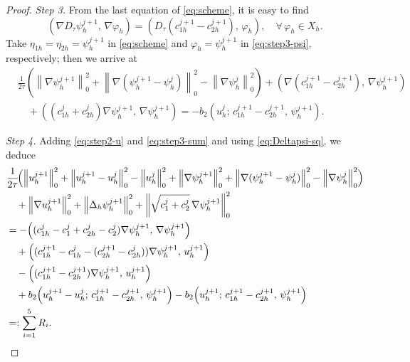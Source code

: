 \begin{proof}
\textit{Step 3.}
From the last equation of \eqref{eq:scheme}, it is easy to find
\begin{equation}
  \left(\nabla D_{\tau}\psi_{h}^{j+1},\, \nabla\varphi_{h}\right)
  = \left(D_{\tau}(c_{1h}^{j+1} - c_{2h}^{j+1}),\, \varphi_{h}\right),
  \quad \forall\,\varphi_{h} \in X_{h}.
  \label{eq:step3-psi}
\end{equation}
Take $\eta_{1h} = \eta_{2h} = \psi_{h}^{j+1}$ in \eqref{eq:scheme} and
$\varphi_{h} = \psi_{h}^{j+1}$ in \eqref{eq:step3-psi}, respectively; then we arrive at
\begin{align}
  &\frac{1}{2\tau}\!\left(
    \left\|\nabla\psi_{h}^{j+1}\right\|_{0}^{2}
    + \left\|\nabla(\psi_{h}^{j+1} - \psi_{h}^{j})\right\|_{0}^{2}
    - \left\|\nabla\psi_{h}^{j}\right\|_{0}^{2}
  \right)
  + \left(\nabla(c_{1h}^{j+1} - c_{2h}^{j+1}),\, \nabla\psi_{h}^{j+1}\right)
  \nonumber\\
  &\quad
  + \left((c_{1h}^{j} + c_{2h}^{j})\nabla\psi_{h}^{j+1},\, \nabla\psi_{h}^{j+1}\right)
  = -b_{2}\!\left(u_{h}^{j};\, c_{1h}^{j+1} - c_{2h}^{j+1},\, \psi_{h}^{j+1}\right).
  \label{eq:step3-sum}
\end{align}

\textit{Step 4.}
Adding \eqref{eq:step2-u} and \eqref{eq:step3-sum} and using \eqref{eq:Deltapsi-sq}, we deduce
\begin{align}
  &\frac{1}{2\tau}\!\Bigl(
    \left\|u_{h}^{j+1}\right\|_{0}^{2}
    + \left\|u_{h}^{j+1} - u_{h}^{j}\right\|_{0}^{2}
    - \left\|u_{h}^{j}\right\|_{0}^{2}
    + \left\|\nabla\psi_{h}^{j+1}\right\|_{0}^{2}
    + \left\|\nabla(\psi_{h}^{j+1} - \psi_{h}^{j})\right\|_{0}^{2}
    - \left\|\nabla\psi_{h}^{j}\right\|_{0}^{2}
  \Bigr)
  \nonumber\\
  &\quad
  + \left\|\nabla u_{h}^{j+1}\right\|_{0}^{2}
  + \left\|\Delta_{h}\psi_{h}^{j+1}\right\|_{0}^{2}
  + \left\|\sqrt{c_{1}^{j} + c_{2}^{j}}\,\nabla\psi_{h}^{j+1}\right\|_{0}^{2}
  \nonumber\\
  &= -\!\left((c_{1h}^{j} - c_{1}^{j} + c_{2h}^{j} - c_{2}^{j})\nabla\psi_{h}^{j+1},\,
              \nabla\psi_{h}^{j+1}\right)
  \nonumber\\
  &\quad
  + \left((c_{1h}^{j+1} - c_{1h}^{j} - (c_{2h}^{j+1} - c_{2h}^{j}))\nabla\psi_{h}^{j+1},\,
         u_{h}^{j+1}\right)
  \nonumber\\
  &\quad
  - \left((c_{1h}^{j+1} - c_{2h}^{j+1})\nabla\psi_{h}^{j+1},\, u_{h}^{j+1}\right)
  \nonumber\\
  &\quad
  + b_{2}\!\left(u_{h}^{j+1} - u_{h}^{j};\, c_{1h}^{j+1} - c_{2h}^{j+1},\, \psi_{h}^{j+1}\right)
  - b_{2}\!\left(u_{h}^{j+1};\, c_{1h}^{j+1} - c_{2h}^{j+1},\, \psi_{h}^{j+1}\right)
  \nonumber\\
  &=: \sum_{i=1}^{5} R_{i}.
  \label{eq:step4-Ri}
\end{align}


\end{proof}
